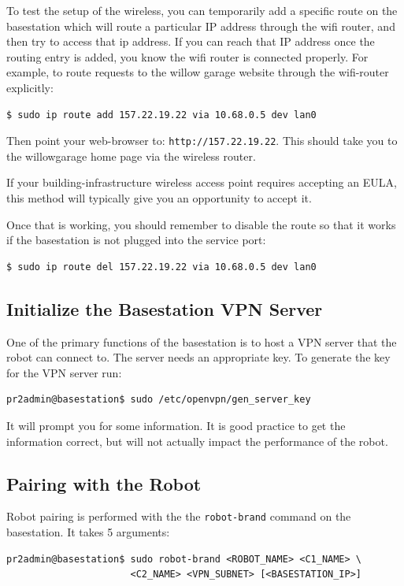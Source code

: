 To test the setup of the wireless, you can temporarily add a specific
route on the basestation which will route a particular IP address
through the wifi router, and then try to access that ip address.  If
you can reach that IP address once the routing entry is added, you
know the wifi router is connected properly.  For example, to route
requests to the willow garage website through the wifi-router
explicitly:
\begin{verbatim}
$ sudo ip route add 157.22.19.22 via 10.68.0.5 dev lan0
\end{verbatim}
Then point your web-browser to: \texttt{http://157.22.19.22}. This
should take you to the willowgarage home page via the wireless router.

If your building-infrastructure wireless access point requires
accepting an EULA, this method will typically give you an opportunity
to accept it.

Once that is working, you should remember to disable the route so that
it works if the basestation is not plugged into the service port:
\begin{verbatim}
$ sudo ip route del 157.22.19.22 via 10.68.0.5 dev lan0
\end{verbatim}

\subsection{Initialize the Basestation VPN Server}
One of the primary functions of the basestation is to host a VPN
server that the robot can connect to.  The server needs an appropriate
key.  To generate the key for the VPN server run:

\begin{verbatim}
pr2admin@basestation$ sudo /etc/openvpn/gen_server_key
\end{verbatim}

It will prompt you for some information.  It is good practice to get
the information correct, but will not actually impact the performance
of the robot.

\subsection{Pairing with the Robot}

Robot pairing is performed with the the \texttt{robot-brand} command
on the basestation.  It takes 5 arguments:

\begin{verbatim}
pr2admin@basestation$ sudo robot-brand <ROBOT_NAME> <C1_NAME> \
                      <C2_NAME> <VPN_SUBNET> [<BASESTATION_IP>]
\end{verbatim}

